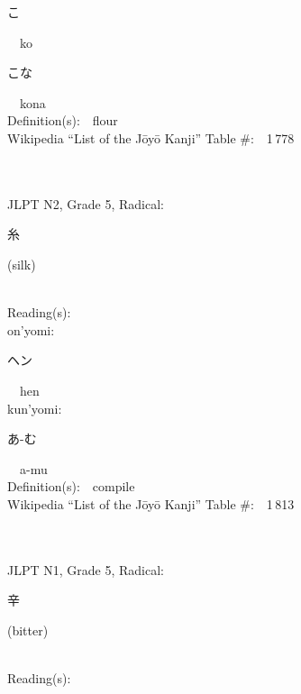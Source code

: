 \begin{multicols}{2}
{\hspace*{2em}}{\begin{CJK}{UTF8}{min} こ \end{CJK}}\ \ ko\ \ \\
{\hspace*{2em}}{\begin{CJK}{UTF8}{min} こな \end{CJK}}\ \ kona\ \ \\
Definition(s):\ \ flour \\
Wikipedia ``List of the J\=oy\=o Kanji'' Table \#:\ \ 1\,778 \\
\ \ \\
{\fontsize{34pt}{40pt}  }\ \ \\  %
{JLPT N2, Grade 5, Radical:\ \ {\begin{CJK}{UTF8}{min} 糸 \end{CJK}} (silk) } \\
Reading(s):\ \ \\
{\hspace*{1em}}on'yomi:\ \ \\
{\hspace*{2em}}{\begin{CJK}{UTF8}{min} ヘン \end{CJK}}\ \ hen\ \ \\
{\hspace*{1em}}kun'yomi:\ \ \\
{\hspace*{2em}}{\begin{CJK}{UTF8}{min} あ-む \end{CJK}}\ \ a-mu\ \ \\
Definition(s):\ \ compile \\
Wikipedia ``List of the J\=oy\=o Kanji'' Table \#:\ \ 1\,813 \\
\ \ \\
{\fontsize{34pt}{40pt}  }\ \ \\  %
{JLPT N1, Grade 5, Radical:\ \ {\begin{CJK}{UTF8}{min} 辛 \end{CJK}} (bitter) } \\
Reading(s):\ \ \\

\end{multicols}
